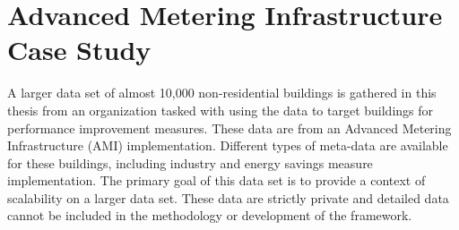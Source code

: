 \section{Advanced Metering Infrastructure Case Study}
\label{sec:smartmeterdata}

A larger data set of almost 10,000 non-residential buildings is gathered in this thesis from an organization tasked with using the data to target buildings for performance improvement measures. These data are from an Advanced Metering Infrastructure (AMI) implementation. Different types of meta-data are available for these buildings, including industry and energy savings measure implementation. The primary goal of this data set is to provide a context of scalability on a larger data set. These data are strictly private and detailed data cannot be included in the methodology or development of the framework.

